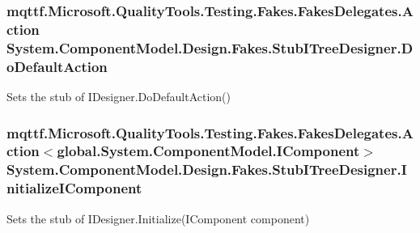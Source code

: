 \hypertarget{class_system_1_1_component_model_1_1_design_1_1_fakes_1_1_stub_i_tree_designer_a5b9b1259018f832e83505ce89eec2e95}{
\subsubsection[{Do\-Default\-Action}]{\setlength{\rightskip}{0pt plus 5cm}mqttf.\-Microsoft.\-Quality\-Tools.\-Testing.\-Fakes.\-Fakes\-Delegates.\-Action System.\-Component\-Model.\-Design.\-Fakes.\-Stub\-I\-Tree\-Designer.\-Do\-Default\-Action}}\label{class_system_1_1_component_model_1_1_design_1_1_fakes_1_1_stub_i_tree_designer_a5b9b1259018f832e83505ce89eec2e95}


Sets the stub of I\-Designer.\-Do\-Default\-Action()

\hypertarget{class_system_1_1_component_model_1_1_design_1_1_fakes_1_1_stub_i_tree_designer_a246d043327d383c0aba68a161b41ccc1}{
\subsubsection[{Initialize\-I\-Component}]{\setlength{\rightskip}{0pt plus 5cm}mqttf.\-Microsoft.\-Quality\-Tools.\-Testing.\-Fakes.\-Fakes\-Delegates.\-Action$<$global.\-System.\-Component\-Model.\-I\-Component$>$ System.\-Component\-Model.\-Design.\-Fakes.\-Stub\-I\-Tree\-Designer.\-Initialize\-I\-Component}}\label{class_system_1_1_component_model_1_1_design_1_1_fakes_1_1_stub_i_tree_designer_a246d043327d383c0aba68a161b41ccc1}


Sets the stub of I\-Designer.\-Initialize(\-I\-Component component)

